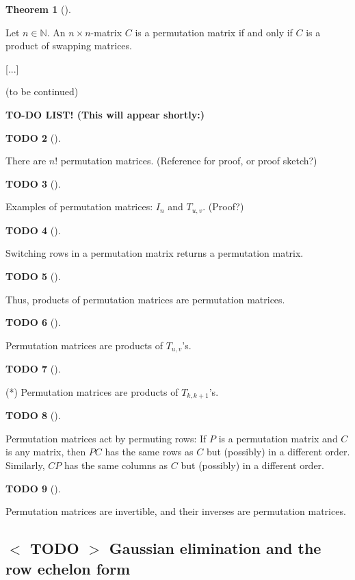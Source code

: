 \documentclass[numbers=enddot,12pt,final,onecolumn,notitlepage]{scrartcl}%
\theoremstyle{definition}
\newtheorem{theo}{Theorem}[section]
\newenvironment{theorem}[1][]
{\begin{theo}[#1]\begin{leftbar}}
{\end{leftbar}\end{theo}}
\newtheorem{quest}[theo]{TODO}
\newenvironment{todo}[1][]
{\begin{quest}[#1]\begin{leftbar}}
{\end{leftbar}\end{quest}}
\begin{document}
\begin{theorem}
\label{thm.permat.Tuv}Let $n\in\mathbb{N}$. An $n\times n$-matrix $C$ is a
permutation matrix if and only if $C$ is a product of swapping matrices.
\end{theorem}

[...]

(to be continued)

\textbf{TO-DO LIST! (This will appear shortly:)}

\begin{todo}
There are $n!$ permutation matrices. (Reference for proof, or proof sketch?)
\end{todo}

\begin{todo}
Examples of permutation matrices: $I_{n}$ and $T_{u,v}$. (Proof?)
\end{todo}

\begin{todo}
Switching rows in a permutation matrix returns a permutation matrix.
\end{todo}

\begin{todo}
Thus, products of permutation matrices are permutation matrices.
\end{todo}

\begin{todo}
Permutation matrices are products of $T_{u,v}$'s.
\end{todo}

\begin{todo}
(*) Permutation matrices are products of $T_{k,k+1}$'s.
\end{todo}

\begin{todo}
Permutation matrices act by permuting rows: If $P$ is a permutation matrix and
$C$ is any matrix, then $PC$ has the same rows as $C$ but (possibly) in a
different order. Similarly, $CP$ has the same columns as $C$ but (possibly) in
a different order.
\end{todo}

\begin{todo}
Permutation matrices are invertible, and their inverses are permutation matrices.
\end{todo}

\subsection{%
$<$%
TODO%
$>$
Gaussian elimination and the row echelon form}
\end{document}

